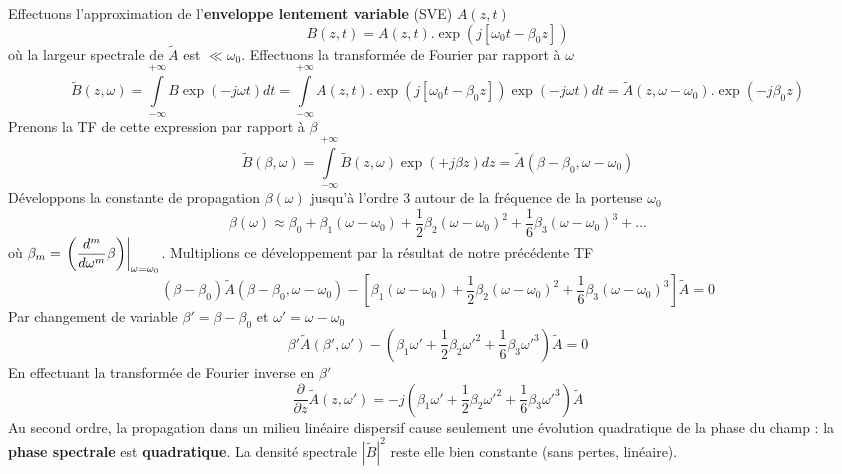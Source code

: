 	Effectuons l'approximation de l'\textbf{enveloppe lentement variable} (SVE) $A(z,t)$
	\begin{equation}
	B(z,t) = A(z,t).\exp \left( {j[{\omega _0}t - {\beta _0}z]} \right)
	\end{equation}
	où la largeur spectrale de $\tilde{A}$ est $\ll \omega_0$. Effectuons la transformée de Fourier
	par rapport à $\omega$
	\begin{equation}
\tilde B(z,\omega ) = \int\limits_{ - \infty }^{ + \infty } {B\exp ( - j\omega t)dt}  = \int\limits_{ - \infty }^{ + \infty } {A(z,t).\exp \left( {j[{\omega _0}t - {\beta _0}z]} \right)\exp ( - j\omega t)dt} 
 = \tilde A(z,\omega  - {\omega _0}).\exp \left( { - j{\beta _0}z} \right)
	\end{equation}
	Prenons la TF de cette expression par rapport à $\beta$
	\begin{equation}
\tilde B(\beta ,\omega ) = \int\limits_{ - \infty }^{ + \infty } {\tilde B(z,\omega )\exp ( + j\beta z)dz} 
 = \tilde A(\beta  - {\beta _0},\omega  - {\omega _0})
	\end{equation}
	Développons la constante de propagation $\beta(\omega)$ jusqu'à l'ordre 3 autour de la fréquence
	de la porteuse $\omega_0$
	\begin{equation}
\beta \left( \omega  \right) \approx {\beta _0} + {\beta _1}\left( {\omega  - {\omega _0}} \right) + \frac{1}{2}{\beta _2}{\left( {\omega  - {\omega _0}} \right)^2} + \frac{1}{6}{\beta _3}{\left( {\omega  - {\omega _0}} \right)^3} + ...
	\end{equation}
	où $\displaystyle {\beta _m} = {\left. {\left( {\frac{{{d^m}}}{{d{\omega ^m}}}\beta } \right)} \right|_{\omega  = {\omega _0}}}$. Multiplions ce développement par la résultat de notre précédente TF
	\begin{equation}
	(\beta  - {\beta _0})\tilde A(\beta  - {\beta _0},\omega  - {\omega _0}) - \left[ {{\beta _1}(\omega  - {\omega _0}) + \frac{1}{2}{\beta _2}{{(\omega  - {\omega _0})}^2} + \frac{1}{6}{\beta _3}{{(\omega  - {\omega _0})}^3}} \right]\tilde A = 0
	\end{equation}
	Par changement de variable $\beta'=\beta-\beta_0$ et $\omega' = \omega-\omega_0$
	\begin{equation}
	\beta '\tilde A(\beta ',\omega ') - ({\beta _1}\omega ' + \frac{1}{2}{\beta _2}\omega {'^2} + \frac{1}{6}{\beta _3}\omega {'^3})\tilde A = 0
	\end{equation}
	En effectuant la transformée de Fourier inverse en $\beta'$
	\begin{equation}
	\frac{\partial }{{\partial z}}\tilde A(z,\omega ') =  - j({\beta _1}\omega ' + \frac{1}{2}{\beta _2}\omega {'^2} + \frac{1}{6}{\beta _3}\omega {'^3})\tilde A
	\end{equation}
	Au second ordre, la propagation dans un milieu linéaire dispersif cause seulement une 
	évolution quadratique de la phase du champ : la \textbf{phase spectrale} est \textbf{quadratique}.
	La densité spectrale $|\tilde{B}|^2$ reste elle bien constante (sans pertes, linéaire).\\
	
